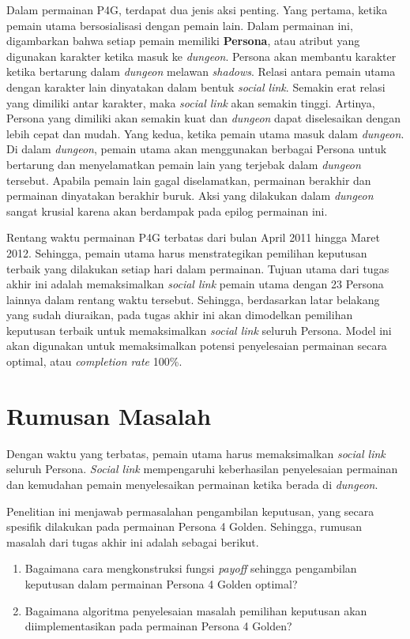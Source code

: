 Dalam permainan P4G, terdapat dua jenis aksi penting. Yang pertama, ketika pemain utama bersosialisasi dengan pemain lain. Dalam permainan ini, digambarkan bahwa setiap pemain memiliki \textbf{Persona}, atau atribut yang digunakan karakter ketika masuk ke \textit{dungeon}. Persona akan membantu karakter ketika bertarung dalam \textit{dungeon} melawan \textit{shadows}. Relasi antara pemain utama dengan karakter lain dinyatakan dalam bentuk \textit{social link}. Semakin erat relasi yang dimiliki antar karakter, maka \textit{social link} akan semakin tinggi. Artinya, Persona yang dimiliki akan semakin kuat dan \textit{dungeon} dapat diselesaikan dengan lebih cepat dan mudah. Yang kedua, ketika pemain utama masuk dalam \textit{dungeon}. Di dalam \textit{dungeon}, pemain utama akan menggunakan berbagai Persona untuk bertarung dan menyelamatkan pemain lain yang terjebak dalam \textit{dungeon} tersebut. Apabila pemain lain gagal diselamatkan, permainan berakhir dan permainan dinyatakan berakhir buruk.
Aksi yang dilakukan dalam \textit{dungeon} sangat krusial karena akan berdampak pada epilog permainan ini.

Rentang waktu permainan P4G terbatas dari bulan April 2011 hingga Maret 2012. Sehingga, pemain utama harus menstrategikan pemilihan keputusan terbaik yang dilakukan setiap hari dalam permainan. Tujuan utama dari tugas akhir ini adalah memaksimalkan \textit{social link} pemain utama dengan 23 Persona lainnya dalam rentang waktu tersebut. Sehingga, berdasarkan latar belakang yang sudah diuraikan, pada tugas akhir ini akan dimodelkan pemilihan keputusan terbaik untuk memaksimalkan \textit{social link} seluruh Persona. Model ini akan digunakan untuk memaksimalkan potensi penyelesaian permainan secara optimal, atau \textit{completion rate} 100\%.

\section{Rumusan Masalah}
Dengan waktu yang terbatas, pemain utama harus memaksimalkan \textit{social link} seluruh Persona. \textit{Social link} mempengaruhi keberhasilan penyelesaian permainan dan kemudahan pemain menyelesaikan permainan ketika berada di \textit{dungeon}.

Penelitian ini menjawab permasalahan pengambilan keputusan, yang secara spesifik dilakukan pada permainan Persona 4 Golden. Sehingga, rumusan masalah dari tugas akhir ini adalah sebagai berikut.
\begin{enumerate}
    \item Bagaimana cara mengkonstruksi fungsi \textit{payoff} sehingga pengambilan keputusan dalam permainan Persona 4 Golden optimal?
    \item Bagaimana algoritma penyelesaian masalah pemilihan keputusan akan diimplementasikan pada permainan Persona 4 Golden?
\end{enumerate}

